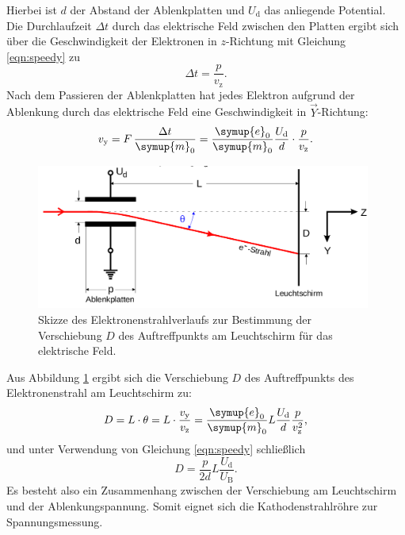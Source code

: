 Hierbei ist $d$ der Abstand der Ablenkplatten und $U_\mathrm{d}$ das anliegende Potential.\\
Die Durchlaufzeit $\Delta t$ durch das elektrische Feld zwischen den Platten ergibt sich über die Geschwindigkeit der Elektronen in $z$-Richtung mit Gleichung \eqref{eqn:speedy} zu
\begin{equation}
  \Delta t=\frac{p}{v_\mathrm{z}} \text{.}
\end{equation}
Nach dem Passieren der Ablenkplatten hat jedes Elektron aufgrund der Ablenkung durch das elektrische Feld eine Geschwindigkeit in $\vec{Y}$-Richtung:
\begin{equation}
  v_\mathrm{y}=F \, \frac{\Delta t}{\symup{m}_0}=\frac{\symup{e}_0}{\symup{m}_0}\frac{U_\mathrm{d}}{d}\cdot\frac{p}{v_\mathrm{z}} \text{.}
\end{equation}
\begin{figure}
  \centering
  \includegraphics[width=0.98\textwidth]{Messdaten/ablenkung.png}
  \caption{Skizze des Elektronenstrahlverlaufs zur Bestimmung der Verschiebung $D$ des Auftreffpunkts am Leuchtschirm für das elektrische Feld.}
  \label{fig:ablenkii}
\end{figure}
Aus Abbildung \ref{fig:ablenkii} ergibt sich die Verschiebung $D$ des Auftreffpunkts des Elektronenstrahl am Leuchtschirm zu:
\begin{equation}
    D=L \cdot \theta=L \cdot \frac{v_\mathrm{y}}{v_\mathrm{z}}=\frac{\symup{e}_0}{\symup{m}_0}L\frac{U_\mathrm{d}}{d}\frac{p}{v_\mathrm{z}^2} \text{,}
\end{equation}
und unter Verwendung von Gleichung \eqref{eqn:speedy} schließlich
\begin{equation}
  \label{eqn:K}
  D=\frac{p}{2d}L\frac{U_\mathrm{d}}{U_\mathrm{B}} \text{.}
\end{equation}
Es besteht also ein Zusammenhang zwischen der Verschiebung am Leuchtschirm und der Ablenkungspannung. Somit eignet sich die Kathodenstrahlröhre zur Spannungsmessung.
